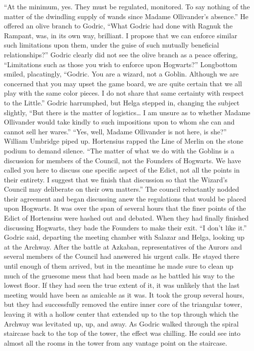 “At the minimum, yes. They must be regulated, monitored. To say nothing of the matter of the dwindling supply of wands since Madame Ollivander’s absence.” He offered an olive branch to Godric, “What Godric had done with Ragnuk the Rampant, was, in its own way, brilliant. I propose that we can enforce similar such limitations upon them, under the guise of such mutually beneficial relationships?”
\SmallVSpace
Godric clearly did not see the olive branch as a peace offering, “Limitations such as those you wish to enforce upon Hogwarts?”
\SmallVSpace
Longbottom smiled, placatingly, “Godric. You are a wizard, not a Goblin. Although we are concerned that you may upset the game board, we are quite certain that we all play with the same color pieces. I do not share that same certainty with respect to the Little.”
\SmallVSpace
Godric harrumphed, but Helga stepped in, changing the subject slightly, “But there is the matter of logistics… I am unsure as to whether Madame Ollivander would take kindly to such impositions upon to whom she can and cannot sell her wares.”
\SmallVSpace
“Yes, well, Madame Ollivander is not here, is she?” William Umbridge piped up.
\SmallVSpace
Hortensius rapped the Line of Merlin on the stone podium to demand silence. “The matter of what we do with the Goblins is a discussion for members of the Council, not the Founders of Hogwarts. We have called you here to discuss one specific aspect of the Edict, not all the points in their entirety. I suggest that we finish that discussion so that the Wizard’s Council may deliberate on their own matters.”
\SomeVSpace
The council reluctantly nodded their agreement and began discussing anew the regulations that would be placed upon Hogwarts. It was over the span of several hours that the finer points of the Edict of Hortensius were hashed out and debated. When they had finally finished discussing Hogwarts, they bade the Founders to make their exit.
\simpleline
“I don’t like it.” Godric said, departing the meeting chamber with Salazar and Helga, looking up at the Archway. After the battle at Azkaban, representatives of the Aurors and several members of the Council had answered his urgent calls. He stayed there until enough of them arrived, but in the meantime he made sure to clean up much of the gruesome mess that had been made as he battled his way to the lowest floor. If they had seen the true extent of it, it was unlikely that the last meeting would have been as amicable as it was.
\SmallVSpace
It took the group several hours, but they had successfully removed the entire inner core of the triangular tower, leaving it with a hollow center that extended up to the top through which the Archway was levitated up, up, and away. As Godric walked through the spiral staircase back to the top of the tower, the effect was chilling. He could see into almost all the rooms in the tower from any vantage point on the staircase.
